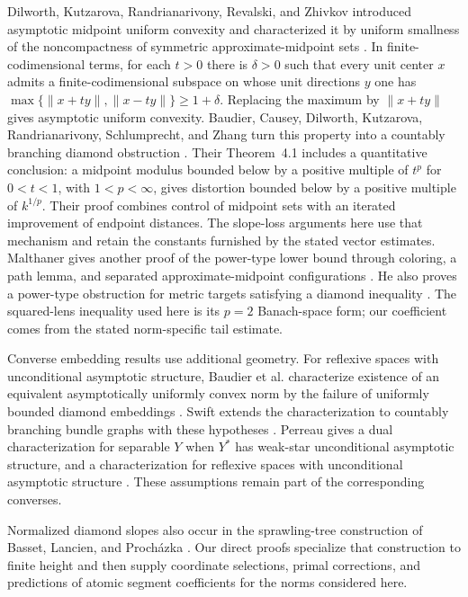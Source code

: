 Dilworth, Kutzarova, Randrianarivony, Revalski, and Zhivkov introduced
asymptotic midpoint uniform convexity and characterized it by uniform
smallness of the noncompactness of symmetric approximate-midpoint sets
\cite[Theorem~2.1 and Definition~2.2]{DKRRZ2016}.
In finite-codimensional terms, for each $t>0$ there is $\delta>0$
such that every unit center $x$ admits a finite-codimensional subspace
on whose unit directions $y$ one has
$\max\{\|x+ty\|,\|x-ty\|\}\ge1+\delta$. Replacing the maximum
by $\|x+ty\|$ gives asymptotic uniform convexity.
Baudier, Causey, Dilworth, Kutzarova, Randrianarivony, Schlumprecht, and Zhang turn this property into a countably branching
diamond obstruction \cite[Section~4]{BaudierEtAl2017}. Their
Theorem~4.1 includes a quantitative conclusion: a midpoint modulus bounded
below by a positive multiple of $t^p$ for $0<t<1$, with
$1<p<\infty$, gives distortion
bounded below by a positive multiple of $k^{1/p}$. Their proof combines control of midpoint
sets with an iterated improvement of endpoint distances. The slope-loss
arguments here use that mechanism and retain the constants furnished by
the stated vector estimates. Malthaner gives another proof of the
power-type lower bound through coloring, a path lemma, and separated
approximate-midpoint configurations
\cite[Theorem~3.5 of arXiv v2]{Malthaner2025}. He also proves a power-type obstruction for metric targets
satisfying a diamond inequality
\cite[Equation~(2) and Theorem~3.7 of arXiv v2]{Malthaner2025}.
The squared-lens inequality used here is its $p=2$ Banach-space form;
our coefficient comes from the stated norm-specific tail estimate.

Converse embedding results use additional geometry. For reflexive spaces
with unconditional asymptotic structure, Baudier et al. characterize
existence of an equivalent asymptotically uniformly convex norm by the
failure of uniformly bounded diamond embeddings
\cite[Corollary~5.3]{BaudierEtAl2017}.
Swift extends the characterization to countably branching bundle graphs
with these hypotheses \cite[Corollary~3.4 and Theorem~6.9]{Swift2018}.
Perreau gives a dual characterization for separable $Y$ when $Y^*$ has
weak-star unconditional asymptotic structure, and a characterization for
reflexive spaces with unconditional asymptotic structure
\cite[Theorems~4.8 and~5.3]{Perreau2021}. These assumptions remain part
of the corresponding converses.

Normalized diamond slopes also occur in the sprawling-tree construction
of Basset, Lancien, and Proch\'azka
\cite[Definition~3.7 and Proposition~6.4]{BassetLancienProchazka2026}.
Our direct proofs specialize that construction to finite height and then
supply coordinate selections, primal corrections, and predictions of
atomic segment coefficients for the norms considered here.

